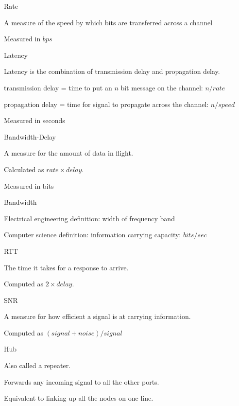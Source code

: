 \documentclass[main.tex]{subfiles}
\begin{document}
\small


\begin{card}{Rate}
\item A measure of the speed by which bits are transferred across a channel
\item Measured in $bps$
\end{card}

\begin{card}{Latency}
\item Latency is the combination of transmission delay and propagation delay.
\item transmission delay = time to put an $n$ bit message on the channel: $n/rate$
\item propagation delay = time for signal to propagate across the channel: $n/speed$
\item Measured in seconds
\end{card}

\begin{card}{Bandwidth-Delay}
\item A measure for the amount of data in flight.
\item Calculated as $rate \times delay$.
\item Measured in bits
\end{card}

\begin{card}{Bandwidth}
\item Electrical engineering definition: width of frequency band
\item Computer science definition: information carrying capacity: $bits/sec$
\end{card}

\begin{card}{RTT}
\item The time it takes for a response to arrive.
\item Computed as $2\times delay$.
\end{card}

\begin{card}{SNR}
\item A measure for how efficient a signal is at carrying information.
\item Computed as $(signal + noise)/signal$
\end{card}

\begin{card}{Hub}
\item Also called a repeater.
\item Forwards any incoming signal to all the other ports.
\item Equivalent to linking up all the nodes on one line.
\end{card}
\end{document}
